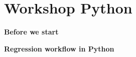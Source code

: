 
\section{Workshop Python} %
\label{sec:workshop_7_python}

\begin{exercise}

\textbf{Before we start}



\end{exercise}

\begin{exercise}

\textbf{Regression workflow in Python}


\end{exercise}
